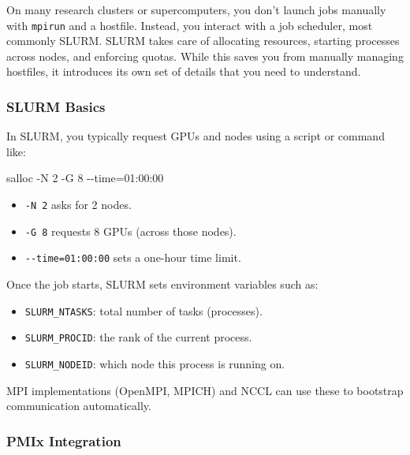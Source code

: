 \documentclass[
  letterpaper,
  DIV=11,
  numbers=noendperiod]{scrreprt}
\newenvironment{Shaded}{\begin{snugshade}}{\end{snugshade}}
\newcommand{\AttributeTok}[1]{\textcolor[rgb]{0.40,0.45,0.13}{#1}}
\newcommand{\ExtensionTok}[1]{\textcolor[rgb]{0.00,0.23,0.31}{#1}}
\newcommand{\NormalTok}[1]{\textcolor[rgb]{0.00,0.23,0.31}{#1}}
\newcommand{\OperatorTok}[1]{\textcolor[rgb]{0.37,0.37,0.37}{#1}}
\providecommand{\tightlist}{%
  \setlength{\itemsep}{0pt}\setlength{\parskip}{0pt}}
\begin{document}
On many research clusters or supercomputers, you don't launch jobs
manually with \texttt{mpirun} and a hostfile. Instead, you interact with
a job scheduler, most commonly SLURM. SLURM takes care of allocating
resources, starting processes across nodes, and enforcing quotas. While
this saves you from manually managing hostfiles, it introduces its own
set of details that you need to understand.

\subsubsection{SLURM Basics}\label{slurm-basics}

In SLURM, you typically request GPUs and nodes using a script or command
like:

\begin{Shaded}
\begin{Highlighting}[]
\ExtensionTok{salloc} \AttributeTok{{-}N}\NormalTok{ 2 }\AttributeTok{{-}G}\NormalTok{ 8 }\AttributeTok{{-}{-}time}\OperatorTok{=}\NormalTok{01:00:00}
\end{Highlighting}
\end{Shaded}

\begin{itemize}
\tightlist
\item
  \texttt{-N\ 2} asks for 2 nodes.
\item
  \texttt{-G\ 8} requests 8 GPUs (across those nodes).
\item
  \texttt{-\/-time=01:00:00} sets a one-hour time limit.
\end{itemize}

Once the job starts, SLURM sets environment variables such as:

\begin{itemize}
\tightlist
\item
  \texttt{SLURM\_NTASKS}: total number of tasks (processes).
\item
  \texttt{SLURM\_PROCID}: the rank of the current process.
\item
  \texttt{SLURM\_NODEID}: which node this process is running on.
\end{itemize}

MPI implementations (OpenMPI, MPICH) and NCCL can use these to bootstrap
communication automatically.

\subsubsection{PMIx Integration}\label{pmix-integration}
\end{document}

